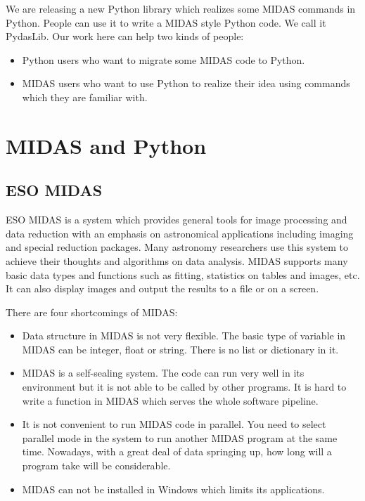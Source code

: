 We are releasing a new Python library which realizes some MIDAS commands in Python. People can use it to write a MIDAS style Python code. We call it PydasLib. Our work here can help two kinds of people:
\begin{itemize}
   \item {}Python users who want to migrate some MIDAS code to Python. 
   \item {}MIDAS users who want to use Python to realize their idea using commands which they are familiar with.
\end{itemize}


          \section{MIDAS and Python}
\subsection{ESO MIDAS}

ESO MIDAS is a system which provides general tools for image processing and data reduction with an emphasis on astronomical applications including imaging and special reduction packages. Many astronomy researchers use this system to achieve their thoughts and algorithms on data analysis. MIDAS supports many basic data types and functions such as fitting, statistics on tables and images, etc. It can also display images and output the results to a file or on a screen.

There are four shortcomings of MIDAS:
\begin{itemize}
  \item  Data structure in MIDAS is not very flexible. The basic type of variable in MIDAS can be integer, float or string. There is no list or dictionary in it. 
   \item  {}MIDAS is a self-sealing system. The code can run very well in its environment but it is not able to be called by other programs. It is hard to write a function in MIDAS which serves the whole software pipeline. 
   \item  It is not convenient to run MIDAS code  in parallel.    You need to select parallel mode in the system to run another MIDAS program at the same time. Nowadays, with a great deal of data  springing up, how long will a program take will be considerable.  
    \item {}MIDAS can not be installed in Windows which limits its applications. 
\end{itemize}

